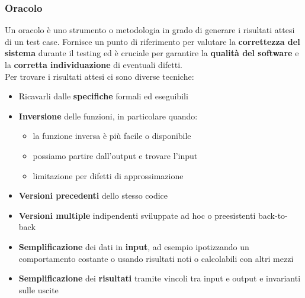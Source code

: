 \subsubsection{Oracolo}
Un oracolo è uno strumento o metodologia in grado di generare i risultati attesi di un test case. Fornisce un punto di riferimento per valutare la \textbf{correttezza del sistema} durante il testing ed è cruciale per garantire la \textbf{qualità del software} e la \textbf{corretta individuazione} di eventuali difetti.\\
Per trovare i risultati attesi ci sono diverse tecniche:
\begin{itemize}
	\item Ricavarli dalle \textbf{specifiche} formali ed eseguibili
	\item \textbf{Inversione} delle funzioni, in particolare quando:
	\begin{itemize}
		\item la funzione inversa è più facile o disponibile
		\item possiamo partire dall'output e trovare l'input
		\item limitazione per difetti di approssimazione
	\end{itemize}
	\item \textbf{Versioni precedenti} dello stesso codice
	\item \textbf{Versioni multiple} indipendenti sviluppate ad hoc o preesistenti back-to-back
	\item \textbf{Semplificazione} dei dati in \textbf{input}, ad esempio ipotizzando un comportamento costante o usando risultati noti o calcolabili con altri mezzi
	\item \textbf{Semplificazione} dei \textbf{risultati} tramite vincoli tra input e output e invarianti sulle uscite
\end{itemize}

